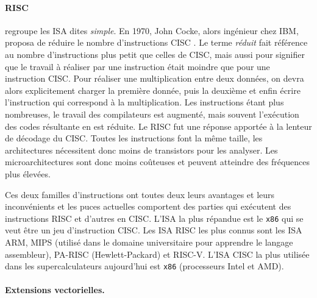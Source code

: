             \paragraph{RISC} regroupe les ISA dites \textit{simple}. En 1970, John Cocke, alors ingénieur chez IBM, proposa de réduire le nombre d'instructions CISC \cite{cocke1990evolution}. Le terme \textit{réduit} fait référence au nombre d'instructions plus petit que celles de CISC, mais aussi pour signifier que le travail à réaliser par une instruction était moindre que pour une instruction CISC. Pour réaliser une multiplication entre deux données, on devra alors explicitement charger la première donnée, puis la deuxième et enfin écrire l'instruction qui correspond à la multiplication. Les instructions étant plus nombreuses, le travail des compilateurs est augmenté, mais souvent l'exécution des codes résultante en est réduite. Le RISC fut une réponse apportée à la lenteur de décodage du CISC.  Toutes les instructions font la même taille, les architectures nécessitent donc moins de transistors pour les analyser. Les microarchitectures sont donc moins coûteuses et peuvent atteindre des fréquences plus élevées. 
        
        
        Ces deux familles d'instructions ont toutes deux leurs avantages et leurs inconvénients et les puces actuelles comportent des parties qui exécutent des instructions RISC et d'autres en CISC. L'ISA la plus répandue est le \verb|x86| qui se veut être un jeu d'instruction CISC. Les ISA RISC les plus connus sont les ISA ARM, MIPS (utilisé dans le domaine universitaire pour apprendre le langage assembleur), PA-RISC (Hewlett-Packard) et RISC-V. L'ISA CISC la plus utilisée dans les supercalculateurs aujourd'hui est \verb|x86| (processeurs Intel et AMD).
        
        
        
        \paragraph{Extensions vectorielles.}
        
